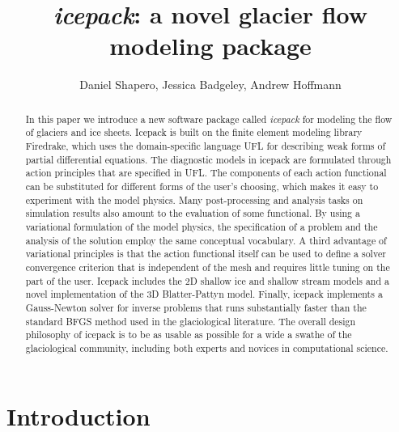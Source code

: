 \documentclass{article}
\title{\emph{icepack}: a novel glacier flow modeling package}
\author{Daniel Shapero, Jessica Badgeley, Andrew Hoffmann}
\date{}
\theoremstyle{definition}
\theoremstyle{plain}
\begin{document}
\tableofcontents
\newpage

\maketitle

\begin{abstract}
In this paper we introduce a new software package called \emph{icepack} for modeling the flow of glaciers and ice sheets.
Icepack is built on the finite element modeling library Firedrake, which uses the domain-specific language UFL for describing weak forms of partial differential equations.
The diagnostic models in icepack are formulated through action principles that are specified in UFL.
The components of each action functional can be substituted for different forms of the user's choosing, which makes it easy to experiment with the model physics.
Many post-processing and analysis tasks on simulation results also amount to the evaluation of some functional.
By using a variational formulation of the model physics, the specification of a problem and the analysis of the solution employ the same conceptual vocabulary.
A third advantage of variational principles is that the action functional itself can be used to define a solver convergence criterion that is independent of the mesh and requires little tuning on the part of the user.
Icepack includes the 2D shallow ice and shallow stream models and a novel implementation of the 3D Blatter-Pattyn model.
Finally, icepack implements a Gauss-Newton solver for inverse problems that runs substantially faster than the standard BFGS method used in the glaciological literature.
The overall design philosophy of icepack is to be as usable as possible for a wide a swathe of the glaciological community, including both experts and novices in computational science.
\end{abstract}

\section{Introduction}
\end{document}
